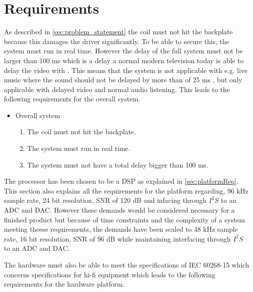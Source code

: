 \chapter{Requirements} \label{ch:requirements}
As described in \autoref{sec:problem_statement} the coil must not hit the backplate because this damages the driver significantly. To be able to secure this, the system must run in real time. However the delay of the full system must not be larger than 100 ms which is a delay a normal modern television today is able to delay the video with \citep{sou:tvDelay}. This means that the system is not applicable with e.g. live music where the sound should not be delayed by more than of 25 ms \citep{sou:liveAudio}, but only applicable with delayed video and normal audio listening. This leads to the following requirements for the overall system.

\begin{itemize}
\item Overall system
\begin{enumerate}
\item [\textlabel{1}{coil}] The coil must not hit the backplate.\\
\item [\textlabel{2}{realtime}] The system must run in real time. \\
\item [\textlabel{3}{delay}] The system must not have a total delay bigger than 100 ms.
\end{enumerate}
\end{itemize}

The processor has been chosen to be a DSP as explained in \autoref{sec:platformReq}. This section also explains all the requirements for the platform regarding, 96 kHz sample rate, 24 bit resolution, SNR of 120 dB and infacing through $I^2S$ to an ADC and DAC. However these demands would be considered necessary for a finished product but because of time constraints and the complexity of a system meeting theese requirements, the demands have been scaled to 48 kHz sample rate, 16 bit resolution, SNR of 96 dB while maintaining interfacing through $I^2S$ to an ADC and DAC. 

The hardware must also be able to meet the specifications of IEC 60268-15 which concerns specifications for hi-fi equipment which leads to the following requirements for the hardware platform.

